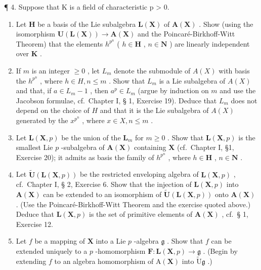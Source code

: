 ¶ 4. Suppose that K is a field of characteristic p \textgreater{} 0.

\begin{enumerate}
\def\labelenumi{(\alph{enumi})}
\item
  Let \(\mathbf{H}\) be a basis of the Lie subalgebra \(\mathbf{L}(\mathbf{X})\) of \(\mathbf{A}(\mathbf{X})\) . Show (using the isomorphism \(\mathbf{U}(\mathbf{L}(\mathbf{X})) \to \mathbf{A}(\mathbf{X})\) and the Poincaré-Birkhoff-Witt Theorem) that the elements \(h^{p^n}\) ( \(h \in \mathbf{H}\) , \(n \in \mathbf{N}\) ) are linearly independent over \(\mathbf{K}\) .
\item
  If \(m\) is an integer \(\geqslant 0\) , let \(L_m\) denote the submodule of \(A(X)\) with basis the \(h^{p^n}\) , where \(h \in H, n \leqslant m\) . Show that \(L_m\) is a Lie subalgebra of \(A(X)\) and that, if \(a \in L_m - 1\) , then \(a^p \in L_m\) (argue by induction on \(m\) and use the Jacobson formulae, cf.~Chapter I, § 1, Exercise 19). Deduce that \(L_m\) does not depend on the choice of \(H\) and that it is the Lie subalgebra of \(A(X)\) generated by the \(x^{p^n}\) , where \(x \in X, n \leqslant m\) .
\item
  Let \(\mathbf{L}(\mathbf{X}, p)\) be the union of the \(\mathbf{L}_m\) for \(m \geqslant 0\) . Show that \(\mathbf{L}(\mathbf{X}, p)\) is the smallest Lie \(p\) -subalgebra of \(\mathbf{A}(\mathbf{X})\) containing \(\mathbf{X}\) (cf.~Chapter I, §1, Exercise 20); it admits as basis the family of \(h^{p^n}\) , where \(h \in \mathbf{H}\) , \(n \in \mathbf{N}\) .
\item
  Let \(\tilde{\mathbf{U}}(\mathbf{L}(\mathbf{X},p))\) be the restricted enveloping algebra of \(\mathbf{L}(\mathbf{X},p)\) , cf.~Chapter I, § 2, Exercise 6. Show that the injection of \(\mathbf{L}(\mathbf{X},p)\) into \(\mathbf{A}(\mathbf{X})\) can be extended to an isomorphism of \(\tilde{\mathbf{U}}(\mathbf{L}(\mathbf{X},p))\) onto \(\mathbf{A}(\mathbf{X})\) . (Use the Poincaré-Birkhoff-Witt Theorem and the exercise quoted above.) Deduce that \(\mathbf{L}(\mathbf{X},p)\) is the set of primitive elements of \(\mathbf{A}(\mathbf{X})\) , cf.~§ 1, Exercise 12.
\item
  Let \(f\) be a mapping of \(\mathbf{X}\) into a Lie \(p\) -algebra \(\mathfrak{g}\) . Show that \(f\) can be extended uniquely to a \(p\) -homomorphism \(\mathbf{F} \colon \mathbf{L}(\mathbf{X}, p) \to \mathfrak{g}\) . (Begin by extending \(f\) to an algebra homomorphism of \(\mathrm{A}(\mathbf{X})\) into \(\tilde{\mathrm{U}}\mathfrak{g}\) .)
\end{enumerate}

